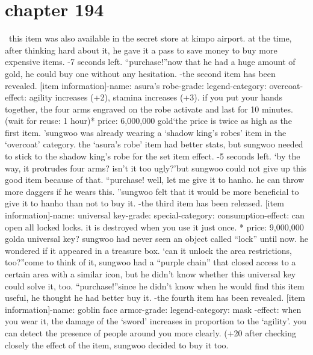 \section{chapter 194}






 this item was also available in the secret store at kimpo airport.
at the time, after thinking hard about it, he gave it a pass to save money to buy more expensive items.
-7 seconds left.
“purchase!”now that he had a huge amount of gold, he could buy one without any hesitation.
-the second item has been revealed.
[item information]-name: asura’s robe-grade: legend-category: overcoat-effect: agility increases (+2), stamina increases (+3).
 if you put your hands together, the four arms engraved on the robe activate and last for 10 minutes.
 (wait for reuse: 1 hour)* price: 6,000,000 gold‘the price is twice as high as the first item.
’sungwoo was already wearing a ‘shadow king’s robes’ item in the ‘overcoat’ category.
the ‘asura’s robe’ item had better stats, but sungwoo needed to stick to the shadow king’s robe for the set item effect.
-5 seconds left.
‘by the way, it protrudes four arms? isn’t it too ugly?’but sungwoo could not give up this good item because of that.
“purchase! well, let me give it to hanho.
 he can throw more daggers if he wears this.
”sungwoo felt that it would be more beneficial to give it to hanho than not to buy it.
-the third item has been released.
[item information]-name: universal key-grade: special-category: consumption-effect: can open all locked locks.
 it is destroyed when you use it just once.
* price: 9,000,000 golda universal key? sungwoo had never seen an object called “lock” until now.
he wondered if it appeared in a treasure box.
‘can it unlock the area restrictions, too?”come to think of it, sungwoo had a “purple chain” that closed access to a certain area with a similar icon, but he didn’t know whether this universal key could solve it, too.
“purchase!”since he didn’t know when he would find this item useful, he thought he had better buy it.
-the fourth item has been revealed.
[item information]-name: goblin face armor-grade: legend-category: mask
-effect: when you wear it, the damage of the ‘sword’ increases in proportion to the ‘agility’.
 you can detect the presence of people around you more clearly.
 (+20%
after checking closely the effect of the item, sungwoo decided to buy it too.
